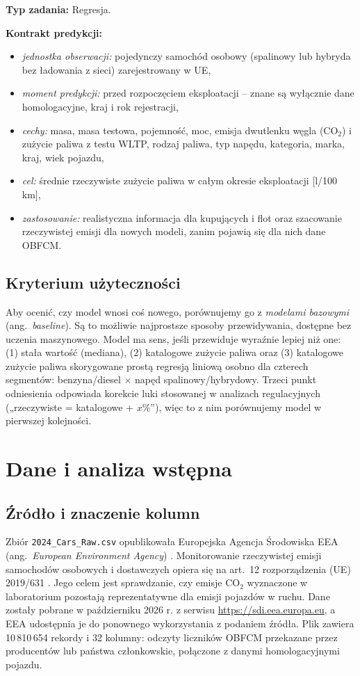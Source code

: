 \documentclass[10pt,twocolumn,a4paper]{article}
\newcommand{\TypZadania}{Regresja}
\begin{document}
\noindent\textbf{Typ zadania:} \TypZadania.

\noindent\textbf{Kontrakt predykcji:}
\begin{itemize}
\item \emph{jednostka obserwacji:} pojedynczy samochód osobowy (spalinowy lub
hybryda bez ładowania z sieci) zarejestrowany w UE,
\item \emph{moment predykcji:} przed rozpoczęciem eksploatacji -- znane są
wyłącznie dane homologacyjne, kraj i rok rejestracji,
\item \emph{cechy:} masa, masa testowa, pojemność, moc, emisja dwutlenku węgla
(CO$_2$) i zużycie paliwa z testu WLTP, rodzaj paliwa, typ napędu, kategoria,
marka, kraj, wiek pojazdu,
\item \emph{cel:} średnie rzeczywiste zużycie paliwa w całym okresie
eksploatacji [l/100\,km],
\item \emph{zastosowanie:} realistyczna informacja dla kupujących i flot oraz
szacowanie rzeczywistej emisji dla nowych modeli, zanim pojawią się dla nich
dane OBFCM.
\end{itemize}

\subsection{Kryterium użyteczności}
Aby ocenić, czy model wnosi coś nowego, porównujemy go z \emph{modelami
bazowymi} (ang.\ \emph{baseline}). Są to możliwie najprostsze sposoby
przewidywania, dostępne bez uczenia maszynowego. Model ma sens, jeśli
przewiduje wyraźnie lepiej niż one: (1) stała wartość (mediana), (2) katalogowe
zużycie paliwa oraz (3) katalogowe zużycie paliwa skorygowane prostą regresją
liniową osobno dla czterech segmentów: benzyna/diesel $\times$ napęd
spalinowy/hybrydowy. Trzeci punkt odniesienia odpowiada korekcie luki
stosowanej w analizach regulacyjnych („rzeczywiste = katalogowe + $x$\%”),
więc to z nim porównujemy model w pierwszej kolejności.

\section{Dane i analiza wstępna}
\subsection{Źródło i znaczenie kolumn}
Zbiór \texttt{2024\_Cars\_Raw.csv} opublikowała Europejska Agencja Środowiska
EEA (ang.\ \emph{European Environment Agency}) \cite{eea2024obfcm}.
Monitorowanie rzeczywistej emisji samochodów osobowych i dostawczych opiera się
na art.~12 rozporządzenia (UE) 2019/631 \cite{reg2019_631}. Jego celem jest
sprawdzanie, czy emisje CO$_2$ wyznaczone w laboratorium pozostają
reprezentatywne dla emisji pojazdów w ruchu. Dane zostały pobrane
w październiku 2026 r. z serwisu \url{https://sdi.eea.europa.eu}, a EEA
udostępnia je do ponownego wykorzystania z podaniem źródła. Plik zawiera
10\,810\,654 rekordy i 32 kolumny: odczyty liczników OBFCM przekazane przez
producentów lub państwa członkowskie, połączone z danymi homologacyjnymi
pojazdu.
\end{document}
